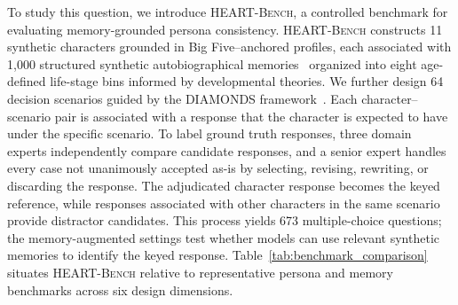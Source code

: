 \documentclass[11pt]{article}
\newcommand{\ourbench}[0]{\textsc{HEART-Bench}\xspace}
\begin{document}
To study this question, we introduce \ourbench, a controlled benchmark for evaluating memory-grounded persona consistency. \ourbench constructs 11 synthetic characters grounded in Big Five--anchored profiles, each associated with 1,000 structured synthetic autobiographical memories~\cite{singer1995seeing} organized into eight age-defined life-stage bins informed by developmental theories. We further design 64 decision scenarios guided by the DIAMONDS framework~\cite{rauthmann2014diamonds}. Each character--scenario pair is associated with a response that the character is expected to have under the specific scenario. To label ground truth responses, three domain experts independently compare candidate responses, and a senior expert handles every case not unanimously accepted as-is by selecting, revising, rewriting, or discarding the response. The adjudicated character response becomes the keyed reference, while responses associated with other characters in the same scenario provide distractor candidates. This process yields 673 multiple-choice questions; the memory-augmented settings test whether models can use relevant synthetic memories to identify the keyed response. Table~\ref{tab:benchmark_comparison} situates \ourbench relative to representative persona and memory benchmarks across six design dimensions.




\end{document}
